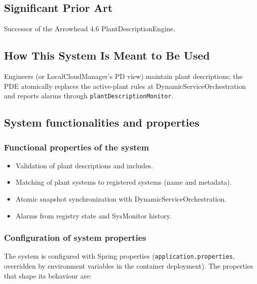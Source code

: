 \documentclass[a4paper]{arrowhead}
\begin{document}
\newpage

\subsection{Significant Prior Art}
\label{sec:prior_art}

Successor of the Arrowhead 4.6 Plant\allowbreak{}Description\allowbreak{}Engine.

\subsection{How This System Is Meant to Be Used}
\label{sec:use}

Engineers (or LocalCloudManager's PD view) maintain plant descriptions; the PDE atomically replaces the active-plant rules at Dynamic\allowbreak{}Service\allowbreak{}Orchestration and reports alarms through \texttt{plant\allowbreak{}Description\allowbreak{}Monitor}.

\subsection{System functionalities and properties}
\label{sec:properties}

\subsubsection{Functional properties of the system}

\begin{itemize}
  \item Validation of plant descriptions and includes.
  \item Matching of plant systems to registered systems (name and metadata).
  \item Atomic snapshot synchronization with Dynamic\allowbreak{}Service\allowbreak{}Orchestration.
  \item Alarms from registry state and SysMonitor history.
\end{itemize}

\subsubsection{Configuration of system properties}

The system is configured with Spring properties (\texttt{application.properties}, overridden by environment variables in the container deployment). The properties that shape its behaviour are:
\end{document}

